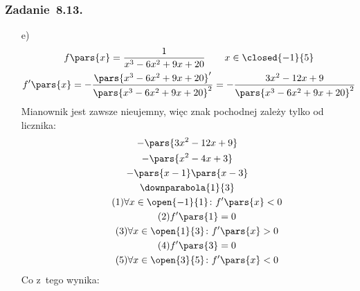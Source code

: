 \subsubsection*{Zadanie~8.13.}
\begin{itemize}
    \item[e)]
        \begin{gather*}
            f\pars{x} = \frac{1}{x^3 - 6x^2 + 9x + 20} \qquad x \in \closed{-1}{5}\\
            f'\pars{x}
                = -\frac{\pars{x^3 - 6x^2 + 9x + 20}'}{\pars{x^3 - 6x^2 + 9x + 20}^2}
                = -\frac{3x^2 - 12x + 9}{\pars{x^3 - 6x^2 + 9x + 20}^2}
        \end{gather*}
        Mianownik jest zawsze nieujemny, więc znak pochodnej zależy tylko od licznika:
        \begin{gather*}
            -\pars{3x^2 - 12x + 9}\\
            -\pars{x^2 - 4x + 3}\\
            -\pars{x - 1}\pars{x - 3}\\
            \downparabola{1}{3}\\
            \tag{\(1\)} \forall x \in \open{-1}{1}\colon f'\pars{x} < 0 \label{2020_10_21:8_13:e:first_decrease}\\
            \tag{\(2\)} f'\pars{1} = 0 \label{2020_10_21:8_13:e:first_zero}\\
            \tag{\(3\)} \forall x \in \open{1}{3}\colon f'\pars{x} > 0 \label{2020_10_21:8_13:e:increase}\\
            \tag{\(4\)} f'\pars{3} = 0 \label{2020_10_21:8_13:e:second_zero}\\
            \tag{\(5\)} \forall x \in \open{3}{5}\colon f'\pars{x} < 0 \label{2020_10_21:8_13:e:second_decrease}
        \end{gather*}
        Co z~tego wynika:
\end{itemize}

